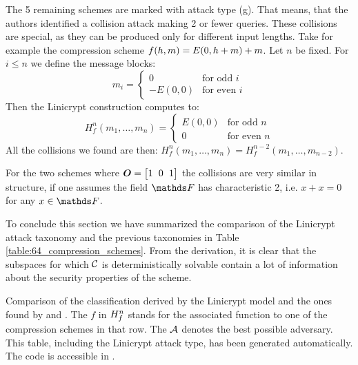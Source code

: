 The 5 remaining schemes are marked with attack type (g).
That means, that the authors \cite{C:BlaRogShr02} identified a collision attack making 2 or fewer queries.
These collisions are special, as they can be produced only for different input lengths.
Take for example the compression scheme $f(h,m) = E(0,h+m) + m$.
Let $n$ be fixed.
For $i \leq n$ we define the message blocks:
\[
m_i = \begin{cases}
0 & \textrm{for odd $i$} \\
-E(0,0) & \textrm{for even $i$}
\end{cases}
\]
Then the Linicrypt \MD construction computes to:
\[
H_f^n(m_1, \dots, m_n) = \begin{cases}
E(0,0) & \textrm{for odd $n$} \\
0 & \textrm{for even $n$}
\end{cases}
\]
All the collisions we found are then: $H^n_f(m_1, \dots, m_n) = H^{n-2}_f(m_1, \dots, m_{n-2})$.

For the two schemes where $\O = \m{1&0&1}$ the collisions are very similar in structure,
if one assumes the field $\F$ has characteristic 2, i.e. $x + x = 0$ for any $x \in \F$.

\begin{center}
\end{center}

To conclude this section we have summarized the comparison of the Linicrypt attack taxonomy and the previous taxonomies in Table \ref{table:64_compression_schemes}.
From the derivation, it is clear that the subspaces for which $\mathcal{C}$ is deterministically solvable
contain a lot of information about the security properties of the scheme.

\begin{table}[ht]
\centering
\renewcommand{\arraystretch}{1.2}

\caption{
    Comparison of the classification derived by the Linicrypt model and the ones found by \cite{C:PreGovVan93} and \cite{C:BlaRogShr02}.
    The $f$ in $H^n_{f}$ stands for the associated function to one of the compression schemes in that row.
    The $\mathcal{A}$ denotes the best possible adversary.
    This table, including the Linicrypt attack type, has been generated automatically.
    The code is accessible in \cite{Semmel_Code_for_Modeling_2022}.
    }
\label{table:64_compression_schemes}
\end{table}


